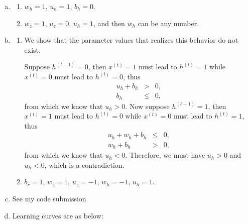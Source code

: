 \documentclass[11pt, oneside]{article}      %
\newcommand{\hasPageBreak}{}
\begin{document}
\begin{enumerate}   [(a)]
\item 
\begin{enumerate}   [i]
\item $w_h = 1$, $u_h = 1$, $b_h = 0$.
\item $w_z = 1$, $u_z = 0$, $u_h = 1$, and then $w_h$ can be any number.
\end{enumerate}






\hasPageBreak
\item
\begin{enumerate}   [i]
\item 
We show that the parameter values that realizes this  behavior do not exist. 

Suppose $h^{(t-1)} = 0$, then $x^{(t)} = 1$ must lead to $h^{(t)} = 1$ while $x^{(t)} = 0$ must lead to $h^{(t)} = 0$, thus
\begin{eqnarray*}
u_h + b_h &>& 0,
\\
b_h &\leq& 0,
\end{eqnarray*}
from which we know that $u_h > 0$. Now suppose $h^{(t-1)} = 1$, then $x^{(t)} = 1$ must lead to $h^{(t)} = 0$ while $x^{(t)} = 0$ must lead to $h^{(t)} = 1$, thus
\begin{eqnarray*}
u_h + w_h + b_h &\leq& 0,
\\
w_h + b_h &>& 0,
\end{eqnarray*}
from which we know that $u_h < 0$. Therefore, we must have $u_h > 0$ and $u_h < 0$, which is a contradiction.



\item
$b_r = 1$, $w_z = 1$, $u_z = -1$, $w_h = -1$, $u_h = 1$.
\end{enumerate}


\item
See my code submission


\hasPageBreak
\item Learning curves are as below:


\end{enumerate}
\end{document}
